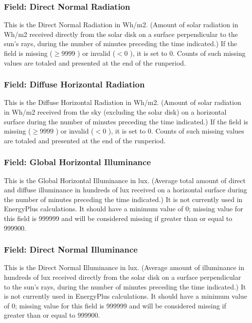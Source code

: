 \subsubsection{Field: Direct Normal Radiation}\label{field-direct-normal-radiation}

This is the Direct Normal Radiation in Wh/m2. (Amount of solar radiation in Wh/m2 received directly from the solar disk on a surface perpendicular to the sun's rays, during the number of minutes preceding the time indicated.) If the field is missing (\(\ge 9999\) ) or invalid (\(<0\) ), it is set to 0. Counts of such missing values are totaled and presented at the end of the runperiod.

\subsubsection{Field: Diffuse Horizontal Radiation}\label{field-diffuse-horizontal-radiation}

This is the Diffuse Horizontal Radiation in Wh/m2. (Amount of solar radiation in Wh/m2 received from the sky (excluding the solar disk) on a horizontal surface during the number of minutes preceding the time indicated.) If the field is missing (\(\ge 9999\) ) or invalid (\(<0\) ), it is set to 0. Counts of such missing values are totaled and presented at the end of the runperiod.

\subsubsection{Field: Global Horizontal Illuminance}\label{field-global-horizontal-illuminance}

This is the Global Horizontal Illuminance in lux. (Average total amount of direct and diffuse illuminance in hundreds of lux received on a horizontal surface during the number of minutes preceding the time indicated.) It is not currently used in EnergyPlus calculations. It should have a minimum value of 0; missing value for this field is 999999 and will be considered missing if greater than or equal to 999900.

\subsubsection{Field: Direct Normal Illuminance}\label{field-direct-normal-illuminance}

This is the Direct Normal Illuminance in lux. (Average amount of illuminance in hundreds of lux received directly from the solar disk on a surface perpendicular to the sun's rays, during the number of minutes preceding the time indicated.) It is not currently used in EnergyPlus calculations. It should have a minimum value of 0; missing value for this field is 999999 and will be considered missing if greater than or equal to 999900.

